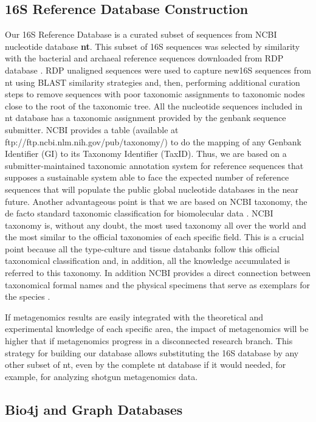 \documentclass{frontiersSCNS} %
\begin{document}
\subsection{16S Reference Database
Construction}\label{s-reference-database-construction}

Our 16S Reference Database is a curated subset of sequences from NCBI
nucleotide database \textbf{nt}. This subset of 16S sequences was
selected by similarity with the bacterial and archaeal reference
sequences downloaded from RDP database \citep{cole2013ribosomal}. RDP
unaligned sequences were used to capture new16S sequences from nt using
BLAST similarity strategies and, then, performing additional curation
steps to remove sequences with poor taxonomic assignments to taxonomic
nodes close to the root of the taxonomic tree. All the nucleotide
sequences included in nt database has a taxonomic assignment provided by
the genbank sequence submitter. NCBI provides a table (available at
ftp://ftp.ncbi.nlm.nih.gov/pub/taxonomy/) to do the mapping of any
Genbank Identifier (GI) to its Taxonomy Identifier (TaxID). Thus, we are
based on a submitter-maintained taxonomic annotation system for
reference sequences that supposes a sustainable system able to face the
expected number of reference sequences that will populate the public
global nucleotide databases in the near future. Another advantageous
point is that we are based on NCBI taxonomy, the de facto standard
taxonomic classification for biomolecular data \citep{cochrane20102010}.
NCBI taxonomy is, without any doubt, the most used taxonomy all over the
world and the most similar to the official taxonomies of each specific
field. This is a crucial point because all the type-culture and tissue
databanks follow this official taxonomical classification and, in
addition, all the knowledge accumulated is referred to this taxonomy. In
addition NCBI provides a direct connection between taxonomical formal
names and the physical specimens that serve as exemplars for the species
\citep{federhen2014type}.

If metagenomics results are easily integrated with the theoretical and
experimental knowledge of each specific area, the impact of metagenomics
will be higher that if metagenomics progress in a disconnected research
branch. This strategy for building our database allows substituting the
16S database by any other subset of nt, even by the complete nt database
if it would needed, for example, for analyzing shotgun metagenomics
data.

\subsection{Bio4j and Graph Databases}\label{bio4j-and-graph-databases}
\end{document}

